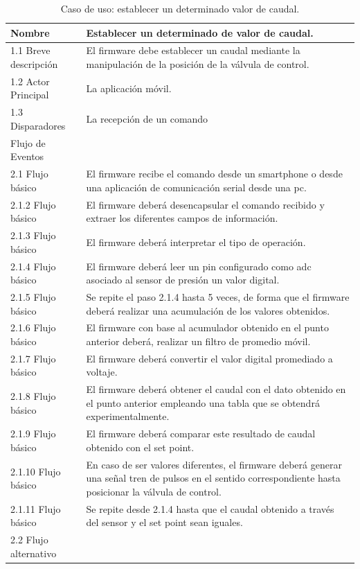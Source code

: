 \begin{table}[H]
\begin{center}
\caption{ Caso de uso: establecer un determinado valor de caudal.}
\begin{tabular}{ | m{4cm} | m{9cm} | }
\hline 
Nombre & Establecer un determinado de valor de caudal.\\ \hline
1.1 Breve descripción &
El firmware debe establecer un caudal mediante la manipulación de la posición de la válvula de control.\\ \hline
 1.2 Actor Principal & La aplicación móvil.\\ \hline
 1.3 Disparadores & La recepción de un comando \\ \hline
Flujo de Eventos & \\ \hline


 2.1 Flujo básico &
El firmware recibe el comando desde un smartphone  o desde una aplicación de comunicación serial desde una pc. \\ \hline
 2.1.2 Flujo básico &
El firmware deberá desencapsular el comando recibido y extraer los diferentes campos de información. \\ \hline
 2.1.3 Flujo básico &
El firmware deberá interpretar el tipo de operación. \\ \hline


 2.1.4 Flujo básico &
El firmware deberá leer un pin configurado como adc asociado al sensor de presión un valor digital. \\ \hline


2.1.5 Flujo básico &
Se repite el paso 2.1.4 hasta 5 veces, de forma que el firmware deberá realizar una acumulación de los valores obtenidos.\\ \hline
2.1.6 Flujo básico &
 El firmware con base al acumulador obtenido en el punto anterior deberá, realizar un filtro de promedio móvil.  \\ \hline
2.1.7 Flujo básico & 
El firmware deberá convertir el valor digital promediado a voltaje.  \\ \hline
2.1.8 Flujo básico & 
El firmware deberá obtener el caudal con el dato obtenido en el punto anterior empleando una tabla que se obtendrá experimentalmente. \\ \hline
2.1.9 Flujo básico &
El firmware deberá comparar este resultado de caudal obtenido con el set point. \\ \hline
2.1.10 Flujo básico &
En caso de ser valores diferentes, el firmware deberá generar una señal  tren de pulsos en el sentido correspondiente hasta posicionar la válvula de control. \\ \hline
2.1.11 Flujo básico &
Se repite desde 2.1.4 hasta que el caudal obtenido a través del sensor y el set point sean iguales. \\ \hline
2.2 Flujo alternativo & \\ \hline



\end{tabular}
\end{center}
\end{table}
